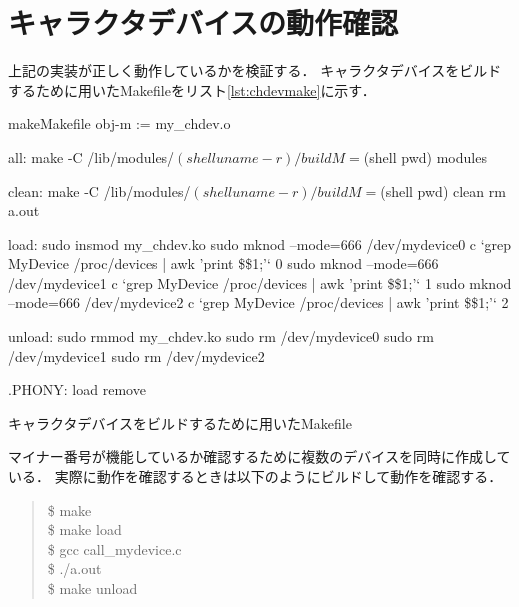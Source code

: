 \section{キャラクタデバイスの動作確認}
上記の実装が正しく動作しているかを検証する．
キャラクタデバイスをビルドするために用いたMakefileをリスト\ref{lst:chdevmake}に示す．
\begin{longlisting}
\begin{myminted}{make}{Makefile}
obj-m := my_chdev.o

all:
	make -C /lib/modules/$(shell uname -r)/build M=$(shell pwd) modules

clean:
	make -C /lib/modules/$(shell uname -r)/build M=$(shell pwd) clean
	rm a.out

load:
	sudo insmod my_chdev.ko
	sudo mknod --mode=666 /dev/mydevice0 c `grep MyDevice /proc/devices | awk '{print \$\$1;}'` 0
	sudo mknod --mode=666 /dev/mydevice1 c `grep MyDevice /proc/devices | awk '{print \$\$1;}'` 1
	sudo mknod --mode=666 /dev/mydevice2 c `grep MyDevice /proc/devices | awk '{print \$\$1;}'` 2

unload:
	sudo rmmod my_chdev.ko
	sudo rm /dev/mydevice0
	sudo rm /dev/mydevice1
	sudo rm /dev/mydevice2


.PHONY: load remove
\end{myminted}
\caption{キャラクタデバイスをビルドするために用いたMakefile}
\label{lst:chdevmake}
\end{longlisting}

マイナー番号が機能しているか確認するために複数のデバイスを同時に作成している．
実際に動作を確認するときは以下のようにビルドして動作を確認する．
\begin{quote}
\$ make \\
\$ make load \\
\$ gcc call\_mydevice.c \\
\$ ./a.out \\
\$ make unload
\end{quote}

